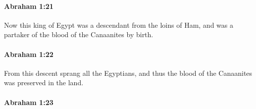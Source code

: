 		\paragraph{Abraham 1:21} %
			\label{ABRAHAM-1-21}

			Now this king of Egypt was a descendant from the loins of Ham, and was a partaker of the blood of the Canaanites by birth.


		\paragraph{Abraham 1:22} %
			\label{ABRAHAM-1-22}

			From this descent sprang all the Egyptians, and thus the blood of the Canaanites was preserved in the land.


		\paragraph{Abraham 1:23} %
			\label{ABRAHAM-1-23}

